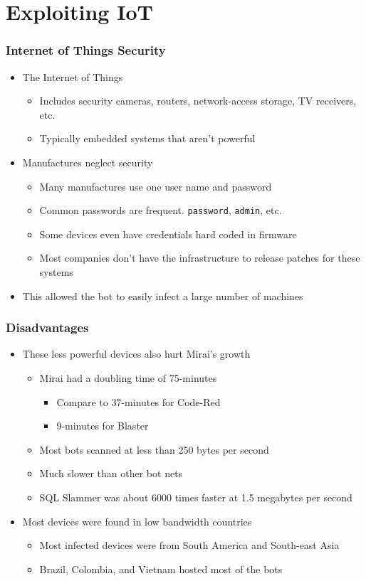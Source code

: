 \documentclass{beamer}
\begin{document}
\section{Exploiting IoT}

\begin{frame}[fragile]
	\frametitle{Internet of Things Security}
	\begin{itemize}
		\item<+-> The Internet of Things
		\begin{itemize}
			\item<+-> Includes security cameras, routers, network-access storage, TV receivers, etc.
			\item<+-> Typically embedded systems that aren't powerful
		\end{itemize}
		\item<+-> Manufactures neglect security
		\begin{itemize}
			\item<+-> Many manufactures use one user name and password
			\item<+-> Common passwords are frequent. \verb|password|, \verb|admin|, etc.
			\item<+-> Some devices even have credentials hard coded in firmware
			\item<+-> Most companies don't have the infrastructure to release patches for these systems
		\end{itemize}
		\item<+-> This allowed the bot to easily infect a large number of machines
	\end{itemize}
\end{frame}

\begin{frame}
	\frametitle{Disadvantages}
	\begin{itemize}
		\item<+-> These less powerful devices also hurt Mirai's growth
		\begin{itemize}
			\item<+-> Mirai had a doubling time of 75-minutes
			\begin{itemize}
				\item<+-> Compare to 37-minutes for Code-Red
				\item<+-> 9-minutes for Blaster
			\end{itemize}
			\item<+-> Most bots scanned at less than 250 bytes per second
			\item<+-> Much slower than other bot nets
			\item<+-> SQL Slammer was about 6000 times faster at 1.5 megabytes per second
		\end{itemize}
		\item<+-> Most devices were found in low bandwidth countries
		\begin{itemize}
			\item<+-> Most infected devices were from South America and South-east Asia
			\item<+-> Brazil, Colombia, and Vietnam hosted most of the bots
		\end{itemize}
	\end{itemize}
\end{frame}
\end{document}
